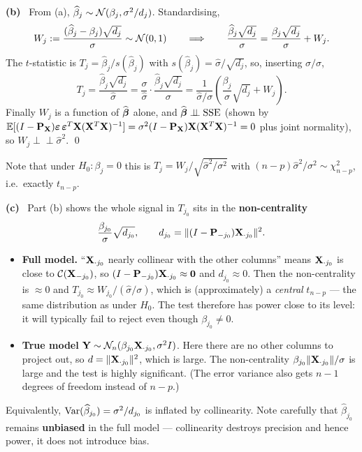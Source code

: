 \documentclass[11pt]{article}
\newcommand{\wh}[1]{\widehat{#1}}
\newcommand{\Pj}{\mathbf{P}}
\newcommand{\SSE}{\mathrm{SSE}}
\newcommand{\ind}{\perp\!\!\!\perp}
\newcounter{qq}[section]
\newcommand{\pt}[1]{\smallskip\noindent\textbf{(#1)}\ }
\begin{document}
\pt{b} From (a), $\wh\beta_j\sim\N(\beta_j,\sigma^2/d_j)$. Standardising,
\[
  W_j:=\frac{(\wh\beta_j-\beta_j)\sqrt{d_j}}{\sigma}\sim\N(0,1)
  \qquad\Longrightarrow\qquad
  \frac{\wh\beta_j\sqrt{d_j}}{\sigma}=\frac{\beta_j\sqrt{d_j}}{\sigma}+W_j .
\]
The $t$-statistic is $T_j=\wh\beta_j/s(\wh\beta_j)$ with $s(\wh\beta_j)=\wh\sigma/\sqrt{d_j}$,
so, inserting $\sigma/\sigma$,
\[
  T_j=\frac{\wh\beta_j\sqrt{d_j}}{\wh\sigma}
     =\frac{\sigma}{\wh\sigma}\cdot\frac{\wh\beta_j\sqrt{d_j}}{\sigma}
     =\frac{1}{\wh\sigma/\sigma}\left(\frac{\beta_j}{\sigma}\sqrt{d_j}+W_j\right).
\]
Finally $W_j$ is a function of $\wh\bb$ alone, and $\wh\bb\ind\SSE$ (shown by
$\E[(I-\Pj_\bX)\bep\,\bep^T\bX(\bX^T\bX)^{-1}]=\sigma^2(I-\Pj_\bX)\bX(\bX^T\bX)^{-1}=0$
plus joint normality), so $W_j\ind\wh\sigma^2$. \qed

Note that under $H_0:\beta_j=0$ this is $T_j=W_j/\sqrt{\wh\sigma^2/\sigma^2}$ with
$(n-p)\wh\sigma^2/\sigma^2\sim\chi^2_{n-p}$, i.e.\ exactly $t_{n-p}$.

\pt{c} Part (b) shows the whole signal in $T_{j_0}$ sits in the \textbf{non-centrality}
\[
  \frac{\beta_{j_0}}{\sigma}\sqrt{d_{j_0}},
  \qquad d_{j_0}=\|(I-\Pj_{-j_0})\bX_{\cdot j_0}\|^2 .
\]
\begin{itemize}
  \item \textbf{Full model.} ``$\mathbf{X}_{\cdot j_0}$ nearly collinear with the other columns''
        means $\mathbf{X}_{\cdot j_0}$ is close to $\mathcal{C}(\mathbf{X}_{-j_0})$, so
        $(I-\Pj_{-j_0})\bX_{\cdot j_0}\approx\zero$ and $d_{j_0}\approx0$. Then the
        non-centrality is $\approx0$ and
        $T_{j_0}\approx W_{j_0}/(\wh\sigma/\sigma)$, which is (approximately) a
        \emph{central} $t_{n-p}$ --- the same distribution as under $H_0$. The test
        therefore has power close to its level: it will typically fail to reject even though
        $\beta_{j_0}\ne0$.
  \item \textbf{True model} $\mathbf{Y}\sim\mathcal{N}_n(\beta_{j_0}\mathbf{X}_{\cdot j_0},\sigma^2I)$. Here there
        are no other columns to project out, so $d=\|\mathbf{X}_{\cdot j_0}\|^2$, which is large.
        The non-centrality $\beta_{j_0}\|\mathbf{X}_{\cdot j_0}\|/\sigma$ is large and the test is
        highly significant. (The error variance also gets $n-1$ degrees of freedom instead
        of $n-p$.)
\end{itemize}
Equivalently, $\Var(\wh\beta_{j_0})=\sigma^2/d_{j_0}$ is inflated by collinearity. Note
carefully that $\wh\beta_{j_0}$ remains \textbf{unbiased} in the full model --- collinearity
destroys precision and hence power, it does not introduce bias.
\end{document}

